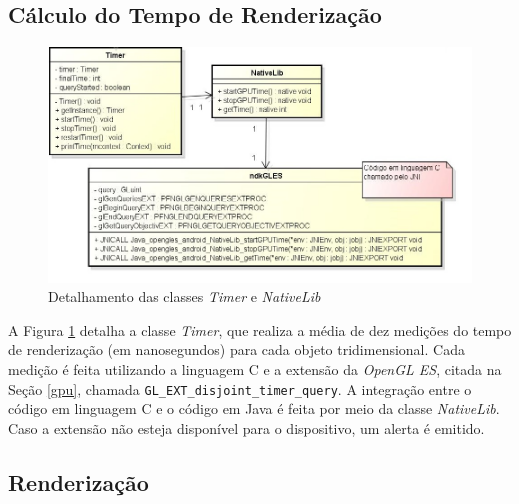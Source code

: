 \subsection{Cálculo do Tempo de Renderização}      

	\begin{figure}[ht]
	\centering
		\includegraphics[keepaspectratio=true,scale=0.6]{figuras/timer_nativelib.jpg}
	\caption{Detalhamento das classes \textit{Timer} e \textit{NativeLib}}
	\label{timer_nativelib}
	\end{figure}

	A Figura \ref{timer_nativelib} detalha a classe \textit{Timer}, que realiza a média de dez medições do tempo de renderização (em nanosegundos) para cada objeto tridimensional. Cada medição é feita utilizando a linguagem C e a extensão da \textit{OpenGL ES}, citada na Seção \ref{gpu}, chamada \texttt{GL\_EXT\_disjoint\_timer\_query}.  A integração entre o código em linguagem C e o código em Java é feita por meio da classe \textit{NativeLib}. Caso a extensão não esteja disponível para o dispositivo, um alerta é emitido.

\subsection{Renderização}    

